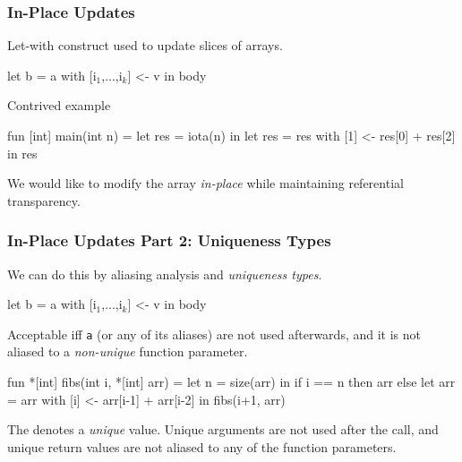 \documentclass{beamer}
\renewcommand{\emph}[1]{\textcolor{structure}{#1}}
\newcommand{\emp}[1]{\textcolor{DikuRed}{ #1}}
\newcommand{\mymath}[1]{$ #1 $}
\newcommand{\myindx}[1]{_{#1}}
\begin{document}





\begin{frame}[fragile,t]
  \frametitle{In-Place Updates}

  Let-with construct used to update slices of arrays.

  \begin{colorcode}
    let b = a with [i\mymath{\myindx{1}},...,i\mymath{\myindx{k}}] <- v
    in body
  \end{colorcode}

  \pause

  \begin{block}{Contrived example}
    \begin{colorcode}
fun [int] main(int n) =
  let res = iota(n) in
  let res = res with [1] <- res[0] + res[2]
  in res
    \end{colorcode}
  \end{block}

  We would like to modify the array {\em in-place} while maintaining
  referential transparency.

\end{frame}

\begin{frame}[fragile,t]
  \frametitle{In-Place Updates Part 2: Uniqueness Types}

  We can do this by aliasing analysis and {\em uniqueness types}.

  \begin{colorcode}
    let b = a with [i\mymath{\myindx{1}},...,i\mymath{\myindx{k}}] <- v
    in body
  \end{colorcode}

  Acceptable iff {\tt a} (or any of its aliases) are not used
  afterwards, and it is not aliased to a {\it non-unique} function
  parameter.

  \begin{colorcode}
    fun \emp{*}[int] fibs(int i, \emp{*}[int] arr) =
      let n = size(arr) in
      if i == n
        then arr
        else
          let arr = arr with [i] <- arr[i-1] + arr[i-2] in
          fibs(i+1, arr)
  \end{colorcode}

  The {\tt *} denotes a {\em unique} value.  Unique arguments are not
  used after the call, and unique return values are not aliased to any
  of the function parameters.

\end{frame}
\end{document}
